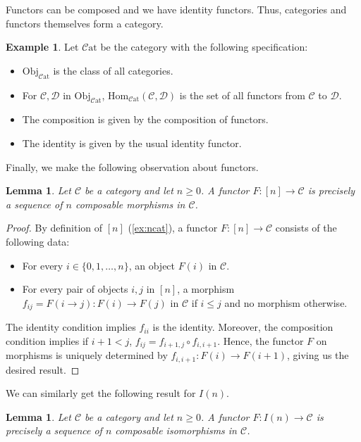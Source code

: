 \documentclass[11pt, a4paper]{amsart}
\newcommand{\cC}{\mathcal{C}}
\newcommand{\cD}{\mathcal{D}}
\newcommand{\Hom}{\mathrm{Hom}}
\newcommand{\Cat}{\mathscr{C}\mathrm{at}}
\newcommand{\Obj}{\mathrm{Obj}}
\newtheorem{lemma}[equation]{Lemma}
\theoremstyle{definition}
\newtheorem{example}[equation]{Example}
\theoremstyle{remark}
\numberwithin{equation}{section}
\begin{document}
Functors can be composed and we have identity functors. Thus, categories and functors themselves form a category.

\begin{example} \label{ex:cat}
 Let $\Cat$ be the category with the following specification:
	\begin{itemize}
		\item $\Obj_{\Cat}$ is the class of all categories.
		\item For $\cC,\cD$ in $\Obj_{\Cat}$, $\Hom_{\Cat}(\cC,\cD)$ is the set of all functors from $\cC$ to $\cD$.
		\item The composition is given by the composition of functors.
		\item The identity is given by the usual identity functor.
	\end{itemize}
\end{example}

Finally, we make the following observation about functors.
\begin{lemma} \label{lemma:functor as sequence of morphisms}
  Let $\cC$ be a category and let $n \geq 0$. A functor $F\colon [n]\to \cC$ is precisely a sequence of $n$ composable morphisms in $\cC$.
\end{lemma}

\begin{proof}
  By definition of $[n]$ (\cref{ex:ncat}), a functor $F\colon [n] \to \cC$ consists of the following data:
  \begin{itemize}
    \item For every $i \in \{ 0,1,\ldots,n \}$, an object $F(i)$ in $\cC$.
    \item For every pair of objects $i,j$ in $[n]$, a morphism $f_{ij} = F(i \to j)\colon F(i) \to F(j)$ in $\cC$ if $i \leq j$ and no morphism otherwise.
  \end{itemize}
  The identity condition implies $f_{ii}$ is the identity. Moreover, the composition condition implies if $i + 1 < j$, $f_{ij} = f_{i+1,j} \circ f_{i,i+1}$. Hence, the functor $F$ on morphisms is uniquely determined by $f_{i,i+1}\colon F(i) \to F(i+1)$, giving us the desired result.
\end{proof}

We can similarly get the following result for $I(n)$.

\begin{lemma} \label{lemma:functor as sequence of isomorphisms}
  Let $\cC$ be a category and let $n \geq 0$. A functor $F\colon I(n)\to \cC$ is precisely a sequence of $n$ composable isomorphisms in $\cC$.
\end{lemma}
\end{document}
